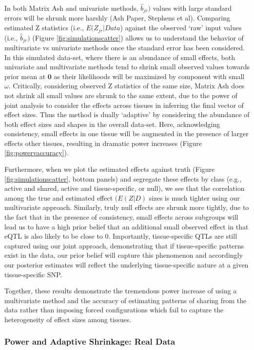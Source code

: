 In both Matrix Ash and univariate methods, $\hat{b}_{jr})$ values with large standard errors will be shrunk more harshly (Ash Paper, Stephens et al). Comparing estimated Z statistics (i.e., $E(Z_{jr}|Data$) against the observed `raw' input values (i.e., $\hat{b}_{jr})$ (Figure \ref{fig:simulationscatter}) allows us to understand the behavior of multivariate vs univariate methods once the standard error has been considered. In this simulated data-set, where there is an abundance of small effects, both univariate and multivariate methods tend to shrink small observed values towards prior mean at $\bm{0}$ as their likelihoods will be maximized by component with small $\omega$. Critically, considering observed Z statistics of the same size, Matrix Ash does not shrink all small values are shrunk to the same extent, due to the power of joint analysis to consider the effects across tissues in inferring the final vector of effect sizes. Thus the method is dually `adaptive' by considering the abundance of both effect sizes and shapes in the overall data-set.  Here, acknowledging consistency, small effects in one tissue will be augmented in the presence of larger effects  other tissues, resulting in dramatic power increases (Figure \ref{fig:powervaccuracy}).

Furthermore, when we plot the estimated effects against truth (Figure \ref{fig:simulationscatter}, bottom panels) and segregate these effects by class  (e.g., active and shared, active and tissue-specific, or null), we see that the correlation among the true and estimated effect $(E(Z|D)$ sizes is much tighter using our multivariate approach. Similarly, truly null effects are shrunk more tightly, due to the fact that in the presence of consistency, small effects across subgroups will lead us to have a high prior belief that an additional small observed effect in that eQTL is also likely to be close to 0. Importantly, tissue-specific QTLs are still captured using our joint approach, demonstrating that if tissue-specific patterns exist in the data, our prior belief will capture this phenomenon and accordingly our posterior estimates will reflect the underlying tissue-specific nature at a given tissue-specific SNP.

Together, these results demonstrate the tremendous power increase of using a multivariate method and the accuracy of estimating patterns of sharing from the data rather than imposing forced configurations which fail to capture the heterogeneity of effect sizes among tissues.


\subsubsection{Power and Adaptive Shrinkage: Real Data}

